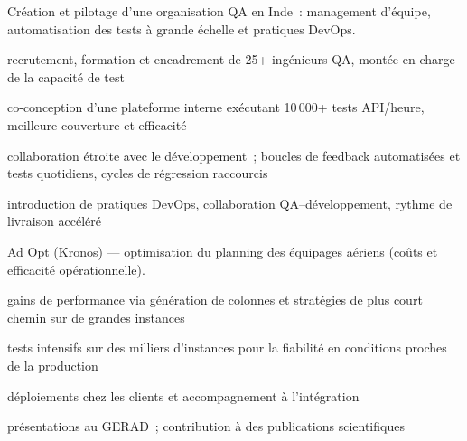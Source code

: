 Cr\'eation et pilotage d'une organisation QA en Inde~: management d'\'equipe, automatisation des tests \`a grande \'echelle et pratiques DevOps.

\begin{cvitemize}
  \item {} recrutement, formation et encadrement de 25+ ing\'enieurs QA, mont\'ee en charge de la capacit\'e de test
  \item {} co-conception d'une plateforme interne ex\'ecutant 10\,000+ tests API/heure, meilleure couverture et efficacit\'e
  \item {} collaboration \'etroite avec le d\'eveloppement~; boucles de feedback automatis\'ees et tests quotidiens, cycles de r\'egression raccourcis
  \item {} introduction de pratiques DevOps, collaboration QA--d\'eveloppement, rythme de livraison acc\'el\'er\'e
\end{cvitemize}

\cvJobSeparator


Ad Opt (Kronos) --- optimisation du planning des \'equipages a\'eriens (co\^uts et efficacit\'e op\'erationnelle).

\begin{cvitemize}
  \item {} gains de performance via g\'en\'eration de colonnes et strat\'egies de plus court chemin sur de grandes instances
  \item {} tests intensifs sur des milliers d'instances pour la fiabilit\'e en conditions proches de la production
  \item {} d\'eploiements chez les clients et accompagnement \`a l'int\'egration
  \item {} pr\'esentations au GERAD~; contribution \`a des publications scientifiques
\end{cvitemize}
